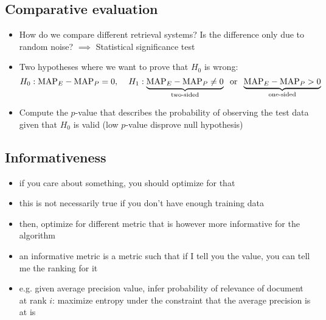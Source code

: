\subsection{Comparative evaluation}
\begin{itemize}
	\item How do we compare different retrieval systems? Is the difference only due to random noise? $\implies$ Statistical significance test
	\item Two hypotheses where we want to prove that $H_0$ is wrong: $$H_0: \text{MAP}_E - \text{MAP}_P = 0, \hspace{4mm} H_1: \underbrace{\text{MAP}_E - \text{MAP}_P \neq 0}_{\text{two-sided}} \text{\hspace{2mm}or\hspace{2mm}}\underbrace{\text{MAP}_E - \text{MAP}_P > 0}_{\text{one-sided}}$$
	\item Compute the $p$-value that describes the probability of observing the test data given that $H_0$ is valid (low $p$-value disprove null hypothesis)
\end{itemize}
\subsection{Informativeness}
\begin{itemize}
	\item if you care about something, you should optimize for that
	\item this is not necessarily true if you don't have enough training data
	\item then, optimize for different metric that is however more informative for the algorithm
	\item an informative metric is a metric such that if I tell you the value, you can tell me the ranking for it
	\item e.g. given average precision value, infer probability of relevance of document at rank $i$: maximize entropy under the constraint that the average precision is at is
\end{itemize}

